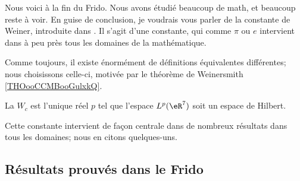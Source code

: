 Nous voici à la fin du Frido. Nous avons étudié beaucoup de math, et beaucoup reste à voir. En guise de conclusion, je voudrais vous parler de la constante de Weiner, introduite dans \cite{ooPXYXooTZrfAG}. Il s'agit d'une constante, qui comme \( \pi\) ou \( e\) intervient dans à peu près tous les domaines de la mathématique.

Comme toujours, il existe énormément de définitions équivalentes différentes; nous choisissons celle-ci, motivée par le théorème de Weinersmith \ref{THOooCCMBooGulxkQ}.
\begin{definition}      \label{DEFooXVXSooVJDTPy}
	La  \( W_c\) est l'unique réel \( p\) tel que l'espace \( L^p(\eR^7)\) soit un espace de Hilbert.
\end{definition}

Cette constante intervient de façon centrale dans de nombreux résultats dans tous les domaines; nous en citons quelques-uns.

\subsection{Résultats prouvés dans le Frido}



